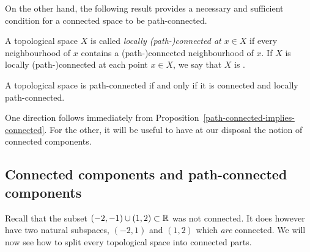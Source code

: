 On the other hand, the following result provides a necessary and sufficient condition for a connected space to be path-connected.
\begin{defn}
  A topological space $X$ is called \emph{locally (path-)connected at $x \in X$} if every neighbourhood of $x$ contains a (path-)connected neighbourhood of $x$. If $X$ is locally (path-)connected at each point $x \in X$, we say that $X$ is .
\end{defn}
\begin{thm}
  \label{path-connected-vs-connected}
  A topological space is path-connected if and only if it is connected and locally path-connected.
\end{thm}
One direction follows immediately from Proposition~\ref{path-connected-implies-connected}. For the other, it will be useful to have at our disposal the notion of connected components.

\subsection{Connected components and path-connected components}
Recall that the subset $(-2,-1) \cup (1,2) \subset \mathbb{R}$ was not connected. It does however have two natural subspaces, $(-2,1)$ and $(1,2)$ which \emph{are} connected. We will now see how to split every topological space into connected parts.

